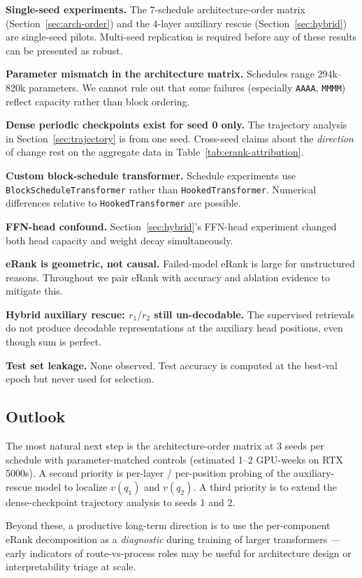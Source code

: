 \documentclass{article}
\begin{document}
\textbf{Single-seed experiments.} The 7-schedule architecture-order matrix (Section~\ref{sec:arch-order}) and the 4-layer auxiliary rescue (Section~\ref{sec:hybrid}) are single-seed pilots. Multi-seed replication is required before any of these results can be presented as robust.

\textbf{Parameter mismatch in the architecture matrix.} Schedules range 294k--820k parameters. We cannot rule out that some failures (especially \texttt{AAAA}, \texttt{MMMM}) reflect capacity rather than block ordering.

\textbf{Dense periodic checkpoints exist for seed 0 only.} The trajectory analysis in Section~\ref{sec:trajectory} is from one seed. Cross-seed claims about the \emph{direction} of change rest on the aggregate data in Table~\ref{tab:erank-attribution}.

\textbf{Custom block-schedule transformer.} Schedule experiments use \texttt{BlockScheduleTransformer} rather than \texttt{HookedTransformer}. Numerical differences relative to \texttt{HookedTransformer} are possible.

\textbf{FFN-head confound.} Section~\ref{sec:hybrid}'s FFN-head experiment changed both head capacity and weight decay simultaneously.

\textbf{eRank is geometric, not causal.} Failed-model eRank is large for unstructured reasons. Throughout we pair eRank with accuracy and ablation evidence to mitigate this.

\textbf{Hybrid auxiliary rescue: $r_1/r_2$ still un-decodable.} The supervised retrievals do not produce decodable representations at the auxiliary head positions, even though sum is perfect.

\textbf{Test set leakage.} None observed. Test accuracy is computed at the best-val epoch but never used for selection.

\subsection{Outlook}

The most natural next step is the architecture-order matrix at 3 seeds per schedule with parameter-matched controls (estimated 1--2 GPU-weeks on RTX 5000s). A second priority is per-layer / per-position probing of the auxiliary-rescue model to localize $v(q_1)$ and $v(q_2)$. A third priority is to extend the dense-checkpoint trajectory analysis to seeds 1 and 2.

Beyond these, a productive long-term direction is to use the per-component eRank decomposition as a \emph{diagnostic} during training of larger transformers --- early indicators of route-vs-process roles may be useful for architecture design or interpretability triage at scale.
\end{document}
